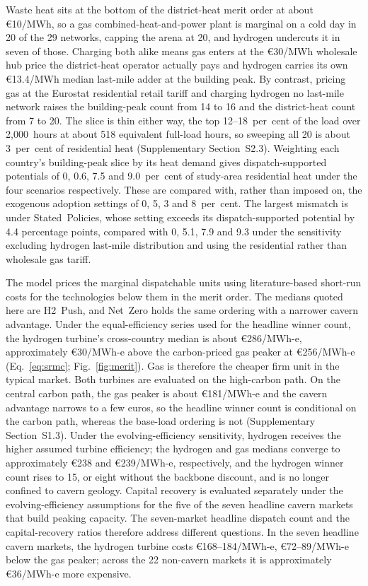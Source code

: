 Waste heat sits at the bottom of the district-heat merit order at about \euro{}10/MWh, so a gas combined-heat-and-power plant is marginal on a cold day in 20 of the 29 networks, capping the arena at 20, and hydrogen undercuts it in seven of those.
Charging both alike means gas enters at the \euro{}30/MWh
wholesale hub price the district-heat operator actually pays and hydrogen carries its own
\euro{}13.4/MWh median last-mile adder at the building peak. By contrast, pricing gas at the Eurostat residential retail tariff and charging hydrogen no last-mile network raises the building-peak count from 14 to 16 and the district-heat count from 7 to 20. The slice is thin either way, the
top 12--18~per~cent of the load over 2{,}000~hours at about 518 equivalent full-load
hours, so sweeping all 20 is about 3~per~cent of residential
heat (Supplementary Section~S2.3).
Weighting each country's building-peak slice by its heat demand gives dispatch-supported potentials of 0, 0.6, 7.5 and 9.0~per~cent of study-area residential heat under the four scenarios respectively. These are compared with, rather than imposed on, the exogenous adoption settings of 0, 5, 3 and 8~per~cent. The largest mismatch is under Stated~Policies, whose setting exceeds its dispatch-supported potential by 4.4 percentage points, compared with 0, 5.1, 7.9 and 9.3 under the sensitivity excluding hydrogen last-mile distribution and using the residential rather than wholesale gas tariff.

The model prices the marginal dispatchable units using literature-based short-run costs
for the technologies below them in the merit order. The medians quoted here are H2~Push,
and Net~Zero holds the same ordering with a narrower cavern advantage. Under the
equal-efficiency series used for the headline winner count, the hydrogen turbine's
cross-country median is about \euro{}286/MWh-e, approximately \euro{}30/MWh-e above the
carbon-priced gas peaker at \euro{}256/MWh-e (Eq.~\eqref{eq:srmc}; Fig.~\ref{fig:merit}).
Gas is therefore the cheaper firm unit in the typical market. Both turbines are evaluated
on the high-carbon path. On the central carbon path, the gas peaker is about
\euro{}181/MWh-e and the cavern advantage narrows to a few euros, so the headline winner
count is conditional on the carbon path, whereas the base-load ordering is not
(Supplementary Section~S1.3). Under the evolving-efficiency sensitivity, hydrogen
receives the higher assumed turbine efficiency; the hydrogen and gas medians converge to
approximately \euro{}238 and \euro{}239/MWh-e, respectively, and the hydrogen winner count
rises to 15, or eight without the backbone discount, and is no longer confined to cavern
geology. Capital recovery is evaluated separately under the evolving-efficiency
assumptions for the five of the seven headline cavern markets that build peaking capacity.
The seven-market headline dispatch count and the capital-recovery ratios therefore address
different questions. In the seven headline cavern markets, the hydrogen turbine costs
\euro{}168--184/MWh-e, \euro{}72--89/MWh-e below the gas peaker; across the 22 non-cavern
markets it is approximately \euro{}36/MWh-e more expensive.

